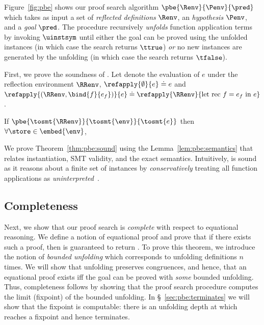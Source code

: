 %
Figure~\ref{fig:pbe} shows our proof search algorithm
$\pbe{\Renv}{\Penv}{\pred}$ which takes as input
%
a set of \emph{reflected definitions} $\Renv$,
%
an \emph{hypothesis} $\Penv$, and
%
a \emph{goal} $\pred$.
%
The \pbename procedure recursively \emph{unfolds}
function application terms by invoking $\uinstsym$
until either the goal can be proved using the
unfolded instances (in which case the search
returns $\ttrue$) \emph{or} no new instances
are generated by the unfolding (in which case
the search returns $\tfalse$).

%
First, we prove the soundness of \pbesym. %
Let  denote the evaluation
of $e$ under the reflection environment $\RRenv$, \ie
$\refapply{\emptyset}{e} \doteq e$
and
$\refapply{(\RRenv, \bind{f}{e_f})}{e} \doteq \refapply{\RRenv}{\text{let rec } f = e_f \text{ in } e}$.

\begin{theorem} \label{thm:pbe:sound}
If   $\pbe{\tosmt{\RRenv}}{\tosmt{\env}}{\tosmt{e}}$
then $\forall \store\in\embed{\env}$,
\end{theorem}

We prove Theorem~\ref{thm:pbe:sound}
using the Lemma~\ref{lem:pbe:semantics} %
that relates instantiation, SMT validity,
and the exact semantics.
%
Intuitively, \pbesym is sound as it
reasons about a finite set of instances
by \emph{conservatively} treating all function
applications as \emph{uninterpreted}~\cite{Nelson81}.


\subsection{Completeness} \label{sec:pbe:complete}

Next, we show that our proof search
is \emph{complete} with respect to
equational reasoning.
%
We define a notion of equational
proof
and prove that
if there exists such a proof,
then
is guaranteed to return \ttrue.
%
To prove this theorem, we introduce
the notion of \emph{bounded unfolding}
which corresponds to unfolding
definitions $n$ times.
%
We will show that unfolding preserves
congruences, and hence, that an equational
proof exists iff the goal can be proved with
\emph{some} bounded unfolding.
%
Thus, completeness follows by showing that
the proof search procedure computes the limit
(\ie fixpoint) of the bounded unfolding.
%
In \S~\ref{sec:pbe:terminates}
we will show that the fixpoint is computable:
there is an unfolding depth at which \pbesym
reaches a fixpoint and hence terminates.

